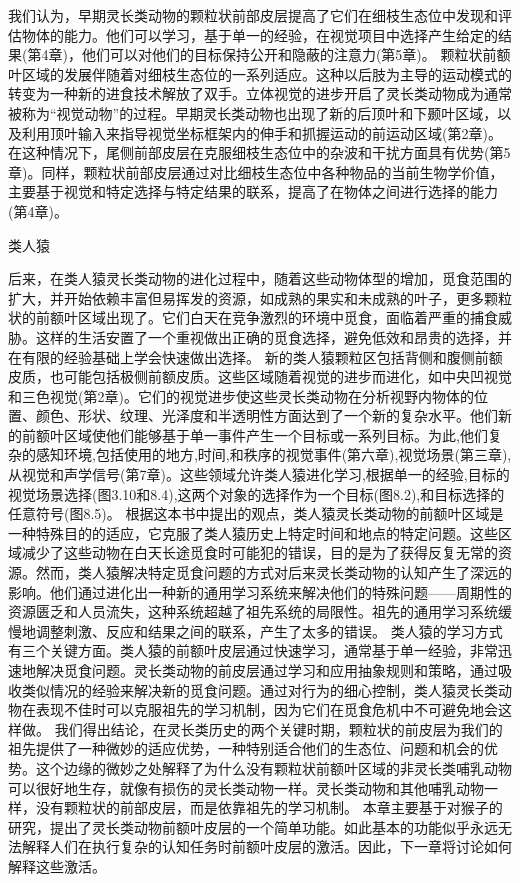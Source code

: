 我们认为，早期灵长类动物的颗粒状前部皮层提高了它们在细枝生态位中发现和评估物体的能力。他们可以学习，基于单一的经验，在视觉项目中选择产生给定的结果(第4章)，他们可以对他们的目标保持公开和隐蔽的注意力(第5章)。
颗粒状前额叶区域的发展伴随着对细枝生态位的一系列适应。这种以后肢为主导的运动模式的转变为一种新的进食技术解放了双手。立体视觉的进步开启了灵长类动物成为通常被称为“视觉动物”的过程。早期灵长类动物也出现了新的后顶叶和下颞叶区域，以及利用顶叶输入来指导视觉坐标框架内的伸手和抓握运动的前运动区域(第2章)。
在这种情况下，尾侧前部皮层在克服细枝生态位中的杂波和干扰方面具有优势(第5章)。同样，颗粒状前部皮层通过对比细枝生态位中各种物品的当前生物学价值，主要基于视觉和特定选择与特定结果的联系，提高了在物体之间进行选择的能力(第4章)。

类人猿

后来，在类人猿灵长类动物的进化过程中，随着这些动物体型的增加，觅食范围的扩大，并开始依赖丰富但易挥发的资源，如成熟的果实和未成熟的叶子，更多颗粒状的前额叶区域出现了。它们白天在竞争激烈的环境中觅食，面临着严重的捕食威胁。这样的生活安置了一个重视做出正确的觅食选择，避免低效和昂贵的选择，并在有限的经验基础上学会快速做出选择。
新的类人猿颗粒区包括背侧和腹侧前额皮质，也可能包括极侧前额皮质。这些区域随着视觉的进步而进化，如中央凹视觉和三色视觉(第2章)。它们的视觉进步使这些灵长类动物在分析视野内物体的位置、颜色、形状、纹理、光泽度和半透明性方面达到了一个新的复杂水平。他们新的前额叶区域使他们能够基于单一事件产生一个目标或一系列目标。为此,他们复杂的感知环境,包括使用的地方,时间,和秩序的视觉事件(第六章),视觉场景(第三章),从视觉和声学信号(第7章)。这些领域允许类人猿进化学习,根据单一的经验,目标的视觉场景选择(图3.10和8.4),这两个对象的选择作为一个目标(图8.2),和目标选择的任意符号(图8.5)。
根据这本书中提出的观点，类人猿灵长类动物的前额叶区域是一种特殊目的的适应，它克服了类人猿历史上特定时间和地点的特定问题。这些区域减少了这些动物在白天长途觅食时可能犯的错误，目的是为了获得反复无常的资源。然而，类人猿解决特定觅食问题的方式对后来灵长类动物的认知产生了深远的影响。他们通过进化出一种新的通用学习系统来解决他们的特殊问题——周期性的资源匮乏和人员流失，这种系统超越了祖先系统的局限性。祖先的通用学习系统缓慢地调整刺激、反应和结果之间的联系，产生了太多的错误。
类人猿的学习方式有三个关键方面。类人猿的前额叶皮层通过快速学习，通常基于单一经验，非常迅速地解决觅食问题。灵长类动物的前皮层通过学习和应用抽象规则和策略，通过吸收类似情况的经验来解决新的觅食问题。通过对行为的细心控制，类人猿灵长类动物在表现不佳时可以克服祖先的学习机制，因为它们在觅食危机中不可避免地会这样做。
我们得出结论，在灵长类历史的两个关键时期，颗粒状的前皮层为我们的祖先提供了一种微妙的适应优势，一种特别适合他们的生态位、问题和机会的优势。这个边缘的微妙之处解释了为什么没有颗粒状前额叶区域的非灵长类哺乳动物可以很好地生存，就像有损伤的灵长类动物一样。灵长类动物和其他哺乳动物一样，没有颗粒状的前部皮层，而是依靠祖先的学习机制。
本章主要基于对猴子的研究，提出了灵长类动物前额叶皮层的一个简单功能。如此基本的功能似乎永远无法解释人们在执行复杂的认知任务时前额叶皮层的激活。因此，下一章将讨论如何解释这些激活。









